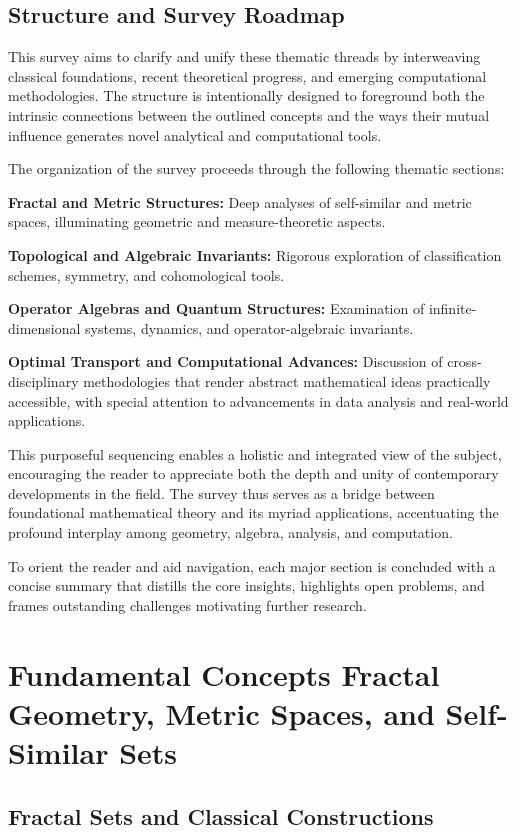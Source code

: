 \documentclass[sigconf]{acmart}
\begin{document}
\subsection{Structure and Survey Roadmap}

This survey aims to clarify and unify these thematic threads by interweaving classical foundations, recent theoretical progress, and emerging computational methodologies. The structure is intentionally designed to foreground both the intrinsic connections between the outlined concepts and the ways their mutual influence generates novel analytical and computational tools.

The organization of the survey proceeds through the following thematic sections:

\textbf{Fractal and Metric Structures:} Deep analyses of self-similar and metric spaces, illuminating geometric and measure-theoretic aspects.

\textbf{Topological and Algebraic Invariants:} Rigorous exploration of classification schemes, symmetry, and cohomological tools.

\textbf{Operator Algebras and Quantum Structures:} Examination of infinite-dimensional systems, dynamics, and operator-algebraic invariants.

\textbf{Optimal Transport and Computational Advances:} Discussion of cross-disciplinary methodologies that render abstract mathematical ideas practically accessible, with special attention to advancements in data analysis and real-world applications.

This purposeful sequencing enables a holistic and integrated view of the subject, encouraging the reader to appreciate both the depth and unity of contemporary developments in the field. The survey thus serves as a bridge between foundational mathematical theory and its myriad applications, accentuating the profound interplay among geometry, algebra, analysis, and computation.

To orient the reader and aid navigation, each major section is concluded with a concise summary that distills the core insights, highlights open problems, and frames outstanding challenges motivating further research.

\section{Fundamental Concepts Fractal Geometry, Metric Spaces, and Self-Similar Sets}

\subsection{Fractal Sets and Classical Constructions}
\end{document}
